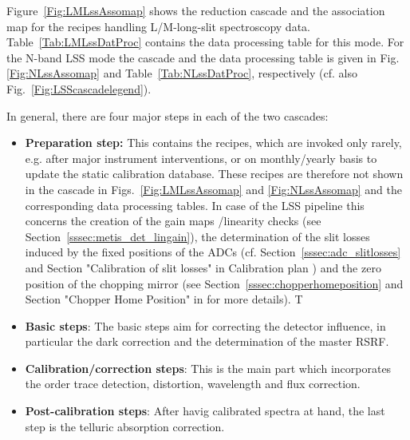 
Figure~\ref{Fig:LMLssAssomap} shows the reduction cascade and the association map for the recipes handling L/M-long-slit
spectroscopy data.  Table~\ref{Tab:LMLssDatProc} contains the data processing table for this mode. For the N-band \ac{LSS} mode the cascade and the data processing table is given in Fig.\ref{Fig:NLssAssomap} and Table~\ref{Tab:NLssDatProc}, respectively (cf. also Fig.~\ref{Fig:LSScascadelegend}).

In general, there are four major steps in each of the two cascades:
\begin{itemize}
    \item \textbf{Preparation step:} This contains the recipes, which are invoked only rarely, e.g. after major instrument interventions, or on monthly/yearly basis to update the static calibration database. These recipes are therefore not shown in the cascade in Figs.~\ref{Fig:LMLssAssomap} and \ref{Fig:NLssAssomap} and the corresponding data processing tables. In case of the \ac{LSS} pipeline this concerns the creation of the gain maps /linearity checks (see Section~\ref{sssec:metis_det_lingain}), the determination of the slit losses induced by the fixed positions of the ADCs (cf. Section~\ref{sssec:adc_slitlosses} and Section "Calibration of slit losses" in Calibration plan \cite{METIS-calibration_plan}) and the zero position of the chopping mirror (see Section~\ref{sssec:chopperhomeposition} and Section "Chopper Home Position" in \cite{METIS-calibration_plan} for more details). T
    \item \textbf{Basic steps}: The basic steps aim for correcting the detector influence, in particular the dark correction and the determination of the master \ac{RSRF}.
    \item \textbf{Calibration/correction steps}: This is the main part which incorporates the order trace detection, distortion, wavelength and flux correction.
    \item \textbf{Post-calibration steps}: After havig calibrated spectra at hand, the last step is the telluric absorption correction.
\end{itemize}

